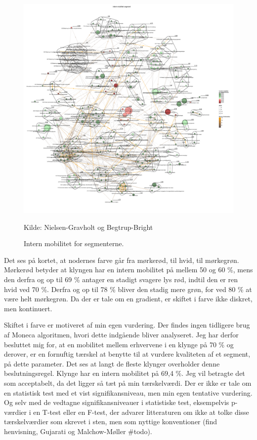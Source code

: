 \begin{figure}[H]
\begin{center}
	\caption{Intern mobilitet for segmenterne.}
	\label{fig_analyse_deskriptivt_kort_intern_mob_seg}
	\includegraphics[width=1.0\textwidth]{fig/netvaerkskort/kort_intern_mob_seg.pdf}
	\centerline{ \tiny{Kilde: Nielsen-Gravholt og Begtrup-Bright}}
\end{center}
\end{figure}
\restoregeometry

Det ses på kortet, at nodernes farve går fra mørkerød, til hvid, til mørkegrøn. Mørkerød betyder at klyngen har en intern mobilitet på mellem 50 og 60 \%, mens den derfra og op til 69 \% antager en stadigt svagere lys rød, indtil den er ren hvid ved 70 \%. Derfra og op til 78 \% bliver den stadig mere grøn, for ved 80 \% at være helt mørkegrøn. Da der er tale om en gradient, er skiftet i farve ikke diskret, men kontinuert. 

Skiftet i farve er motiveret af min egen vurdering. Der findes ingen tidligere brug af Moneca algoritmen, hvori dette indgående bliver analyseret. Jeg har derfor besluttet mig for, at en mobilitet mellem erhvervene i en klynge på 70 \% og derover, er en fornuftig tærskel at benytte til at  vurdere kvaliteten af et segment, på dette parameter. Det ses at langt de fleste klynger overholder denne beslutningsregel. Klynge  har en intern mobilitet på 69,4 \%. Jeg vil betragte det som acceptabelt, da det ligger så tæt på min tærskelværdi. Der er ikke er tale om en statistisk test med et vist signifikansniveau, men min egen tentative vurdering. Og selv med de vedtagne signifikansniveauer i statistiske test, eksempelvis p-værdier i en T-test eller en F-test,  der advarer litteraturen om ikke at tolke disse tærskelværdier som skrevet i sten, men som nyttige konventioner (find henvisning, Gujarati og Malchow-Møller \#todo). 

